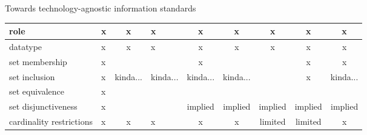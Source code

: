 \begin{frame}{Towards technology-agnostic information standards}
\begin{table}[overview of supported constructs for different meta-models]
{\begin{tabular}{lacoccccc}
    role                     & x                    & x                      & x                & x                  & x                                                                 & x                                                                 & x                  & x                  \\ \hline
    datatype                 & x                    & x                      & x                & x                  & x                                                                 & x                                                                 & x                  & x                  \\ \hline
    set membership           & x                    &                        &                  & x                  &                                                                   &                                                                   & x                  & x                  \\ \hline
    set inclusion            & x                    & kinda...               & kinda...         & kinda...           & kinda...                                                          &                                                                   & x                  & kinda...           \\ \hline
    set equivalence          & x                    &                        &                  &                    &                                                                   &                                                                   &                    &                    \\ \hline
    set disjunctiveness      & x                    &                        &                  & implied            & implied                                                           & implied                                                           & implied            & implied            \\ \hline
    cardinality restrictions & x                    & x                      & x                & x                  & x                                                                 & limited                                                           & limited            & x                 
    \end{tabular}
    }
\end{table}
    

    
\end{frame}